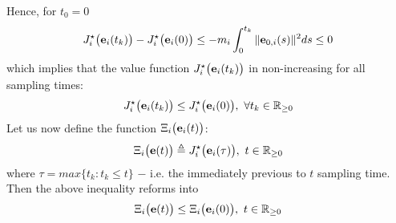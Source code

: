 Hence, for $t_0 = 0$
\begin{align}
  J_i^{\star}\big(\bm{\mathbf{e}}_i(t_{k})\big) - J_i^{\star}\big(\bm{\mathbf{e}}_i(0)\big) \leq
    -m_i \int_{0}^{t_{k}} \|\bm{\mathbf{e}}_{0,i}(s)\|^2 ds \leq 0
\label{eq:J_opt_between_k_and_0}
\end{align}
which implies that the value function $J_i^{\star}\big(\bm{\mathbf{e}}_i(t_{k})\big)$
in non-increasing for all sampling times:
\begin{align}
  J_i^{\star}\big(\bm{\mathbf{e}}_i(t_{k})\big) \leq J_i^{\star}\big(\bm{\mathbf{e}}_i(0)\big),\ \forall t_k \in \mathbb{R}_{\geq0}
\end{align}
Let us now define the function $\Xi_i\big(\bm{\mathbf{e}}_i(t)\big)$:
\begin{align}
  \Xi_i\big(\bm{\mathbf{e}}(t)\big) \triangleq J_i^{\star}\big(\bm{\mathbf{e}}_i(\tau)\big),\ t \in \mathbb{R}_{\geq0}
\end{align}
where $\tau = max\{t_k : t_k \leq t\}$ $-$ i.e. the immediately previous to
$t$ sampling time. Then the above inequality reforms into
\begin{align}
  \Xi_i\big(\bm{\mathbf{e}}(t)\big) \leq \Xi_i\big(\bm{\mathbf{e}}_i(0)\big),\ t \in \mathbb{R}_{\geq0}
\end{align}

